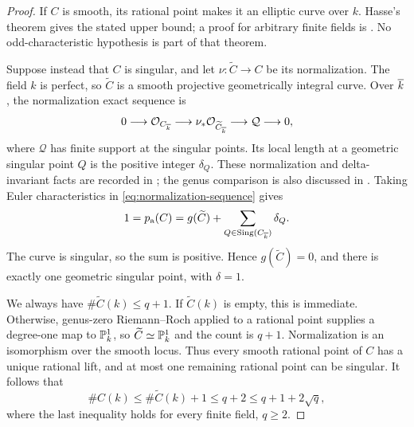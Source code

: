 \begin{proof}
If \(C\) is smooth, its rational point makes it an elliptic curve
over \(k\). Hasse's theorem gives the stated upper bound; a proof
for arbitrary finite fields is \citet[Theorem 7.3]{Sutherland2021}.
No odd-characteristic hypothesis is part of that theorem.

Suppose instead that \(C\) is singular, and let
\(\nu:\widetilde C\to C\) be its normalization. The field
\(k\) is perfect, so \(\widetilde C\) is a smooth projective
geometrically integral curve. Over \(\overline{k}\), the normalization
exact sequence is
\begin{equation}\label{eq:normalization-sequence}
0\longrightarrow\mathcal O_{C_{\overline{k}}}
\longrightarrow\nu_*\mathcal O_{\widetilde C_{\overline{k}}}
\longrightarrow\mathcal Q\longrightarrow0,
\end{equation}
where \(\mathcal Q\) has finite support at the singular points.
Its local length at a geometric singular point \(Q\) is the
positive integer \(\delta_Q\). These normalization and
delta-invariant facts are recorded in
\citet[\href{https://stacks.math.columbia.edu/tag/0C3Q}{Tag 0C3Q},
Lemma 33.39.2, Definition 33.39.3 and Lemma 33.39.4]{stacks-project}; the genus comparison is
also discussed in
\citet[\href{https://stacks.math.columbia.edu/tag/0CE0}{Tag 0CE0}]{stacks-project}.
Taking Euler characteristics in \eqref{eq:normalization-sequence}
gives
\begin{equation}\label{eq:delta-genus}
1=p_{\mathrm a}(C)=g(\widetilde C)+
\sum_{Q\in\operatorname{Sing}(C_{\overline{k}})}\delta_Q.
\end{equation}
The curve is singular, so the sum is positive. Hence
\(g(\widetilde C)=0\), and there is exactly one geometric
singular point, with \(\delta=1\).

We always have \(\#\widetilde C(k)\le q+1\). If
\(\widetilde C(k)\) is empty, this is immediate. Otherwise,
genus-zero Riemann--Roch applied to a rational point supplies a
degree-one map to \(\mathbb P^1_k\), so
\(\widetilde C\simeq\mathbb P^1_k\) and the count is \(q+1\).
Normalization is an isomorphism over the smooth locus. Thus every
smooth rational point of \(C\) has a unique rational lift, and
at most one remaining rational point can be singular. It follows that
\begin{equation}\label{eq:singular-bound}
\#C(k)\le\#\widetilde C(k)+1\le q+2
\le q+1+2\sqrt q,
\end{equation}
where the last inequality holds for every finite field, \(q\ge2\).
\end{proof}

